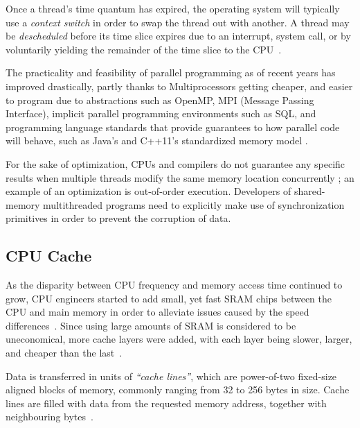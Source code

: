\begin{definition}
Once a thread's time quantum has expired, the operating system will typically
use a \emph{context switch} in order to swap the thread out with another. A thread
may be \emph{descheduled} before its time slice expires due to an interrupt,
system call, or by voluntarily yielding the remainder of the time slice to the CPU~\cite[Section~3.2.3]{osconcepts2021}.
\end{definition}

The practicality and feasibility of parallel programming as of recent years has
improved drastically, partly thanks to Multiprocessors getting cheaper, and
easier to program due to abstractions such as OpenMP, MPI (Message Passing
Interface), implicit parallel programming environments such as SQL, and
programming language standards that provide guarantees to how parallel code will
behave, such as Java's\cite{javamemorymodel2014} and C++11's
\cite{cppmemorymodel} standardized memory model
\cite[Chapter~2.2]{perfbook2021}.

For the sake of optimization, CPUs and compilers do not guarantee any specific
results when multiple threads modify the same memory location concurrently
\cite{drepper2007every}; an example of an optimization is out-of-order
execution\cite[Appendix~B.7.1]{perfbook2021}. Developers of shared-memory
multithreaded programs need to explicitly make use of synchronization
primitives in order to prevent the corruption of data.

\subsection{CPU Cache}
As the disparity between CPU frequency and memory access time continued to
grow, CPU engineers started to add small, yet fast SRAM chips between the CPU
and main memory in order to alleviate issues caused by the speed
differences~\cite{cantrill2008real, drepper2007every , perfbook2021}. Since
using large amounts of SRAM is considered to be uneconomical, more cache layers
were added, with each layer being slower, larger, and cheaper than the
last~\cite{drepper2007every, perfbook2021}.

Data is transferred in units of \emph{``cache lines''}, which are power-of-two
fixed-size aligned blocks of memory, commonly ranging from 32 to 256 bytes in
size. Cache lines are filled with data from the requested memory address,
together with neighbouring bytes~\cite[Section~3.2.1]{perfbook2021}.

